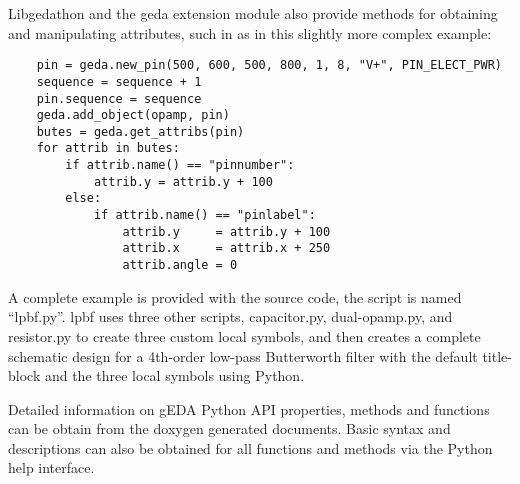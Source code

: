   Libgedathon and the geda extension module also provide methods for obtaining and manipulating attributes, such in as in this slightly more complex example: \begin{verbatim}
	pin = geda.new_pin(500, 600, 500, 800, 1, 8, "V+", PIN_ELECT_PWR)
	sequence = sequence + 1
	pin.sequence = sequence
	geda.add_object(opamp, pin)
	butes = geda.get_attribs(pin)
	for attrib in butes:
		if attrib.name() == "pinnumber":
		    attrib.y = attrib.y + 100
		else:
		    if attrib.name() == "pinlabel":
		        attrib.y     = attrib.y + 100
		        attrib.x     = attrib.x + 250
		        attrib.angle = 0
\end{verbatim}

  A complete example is provided with the source code, the script is named ``lpbf.py''. lpbf uses three other scripts, capacitor.py, dual-opamp.py, and resistor.py to create three custom local symbols, and then creates a complete schematic design for a 4th-order low-pass Butterworth filter with the default title-block and the three local symbols using Python. 

  Detailed information on gEDA Python API properties, methods and functions can be obtain from the doxygen generated documents. Basic syntax and descriptions can also be obtained for all functions and methods via the Python help interface. 
